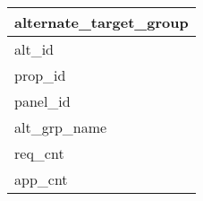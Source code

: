 \documentclass{article}
\begin{document}

\begin{tabular}{|l|} \hline
\textbf{alternate\_target\_group} \\ \hline
alt\_id \\ \hline
prop\_id \\ \hline
panel\_id \\ \hline
alt\_grp\_name \\ \hline
req\_cnt \\ \hline
app\_cnt \\ \hline
\end{tabular}
\end{document}

